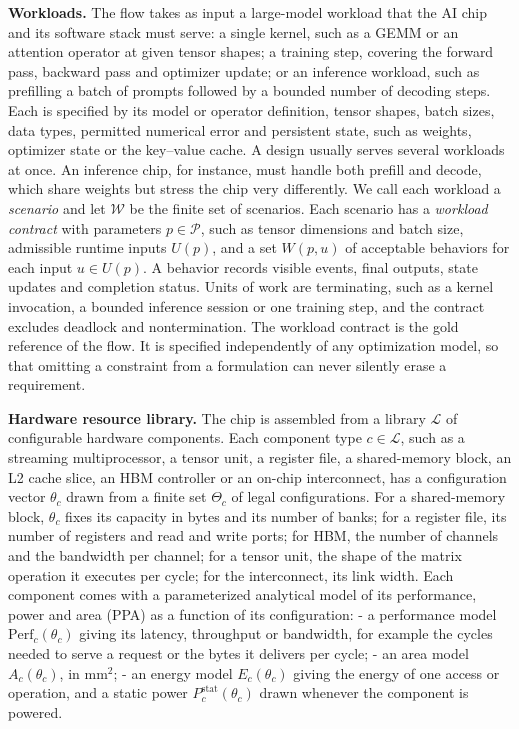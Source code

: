 \documentclass[11pt]{article}
\begin{document}
\textbf{Workloads.} The flow takes as input a large-model workload that the AI chip and its software stack must serve: a single kernel, such as a GEMM or an attention operator at given tensor shapes; a training step, covering the forward pass, backward pass and optimizer update; or an inference workload, such as prefilling a batch of prompts followed by a bounded number of decoding steps. Each is specified by its model or operator definition, tensor shapes, batch sizes, data types, permitted numerical error and persistent state, such as weights, optimizer state or the key--value cache. A design usually serves several workloads at once. An inference chip, for instance, must handle both prefill and decode, which share weights but stress the chip very differently. We call each workload a \emph{scenario} and let \(\mathcal W\) be the finite set of scenarios. Each scenario has a \emph{workload contract} with parameters \(p\in\mathcal P\), such as tensor dimensions and batch size, admissible runtime inputs \(U(p)\), and a set \(W(p,u)\) of acceptable behaviors for each input \(u\in U(p)\). A behavior records visible events, final outputs, state updates and completion status. Units of work are terminating, such as a kernel invocation, a bounded inference session or one training step, and the contract excludes deadlock and nontermination. The workload contract is the gold reference of the flow. It is specified independently of any optimization model, so that omitting a constraint from a formulation can never silently erase a requirement.

\textbf{Hardware resource library.} The chip is assembled from a library \(\mathcal L\) of configurable hardware components. Each component type \(c\in\mathcal L\), such as a streaming multiprocessor, a tensor unit, a register file, a shared-memory block, an L2 cache slice, an HBM controller or an on-chip interconnect, has a configuration vector \(\theta_c\) drawn from a finite set \(\Theta_c\) of legal configurations. For a shared-memory block, \(\theta_c\) fixes its capacity in bytes and its number of banks; for a register file, its number of registers and read and write ports; for HBM, the number of channels and the bandwidth per channel; for a tensor unit, the shape of the matrix operation it executes per cycle; for the interconnect, its link width. Each component comes with a parameterized analytical model of its performance, power and area (PPA) as a function of its configuration:
- a performance model \(\mathrm{Perf}_c(\theta_c)\) giving its latency, throughput or bandwidth, for example the cycles needed to serve a request or the bytes it delivers per cycle;
- an area model \(A_c(\theta_c)\), in mm\ensuremath{^2};
- an energy model \(E_c(\theta_c)\) giving the energy of one access or operation, and a static power \(P^{\mathrm{stat}}_c(\theta_c)\) drawn whenever the component is powered.
\end{document}
